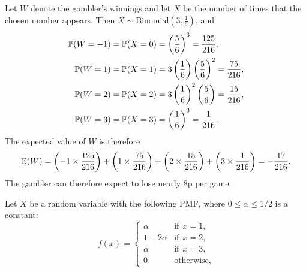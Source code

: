 \begin{exercise}
\begin{questions}
\begin{answer}
Let $W$ denote the gambler's winnings and let $X$ be the number of times that the chosen number appears. Then $X\sim\text{Binomial}(3,\frac{1}{6})$, and
\begin{align*}
\mathbb{P}(W=-1)	& = \mathbb{P}(X=0) = 	\left(\frac{5}{6}\right)^3							= \frac{125}{216}, \\
\mathbb{P}(W= 1)	& = \mathbb{P}(X=1) = 	3\left(\frac{1}{6}\right)\left(\frac{5}{6}\right)^2 	= \frac{75}{216}, \\
\mathbb{P}(W= 2)	& = \mathbb{P}(X=2) = 	3\left(\frac{1}{6}\right)^2\left(\frac{5}{6}\right)   	= \frac{15}{216}, \\
\mathbb{P}(W= 3)	& = \mathbb{P}(X=3) = 	\left(\frac{1}{6}\right)^3 = \frac{1}{216}. \\
\end{align*}
The expected value of $W$ is therefore
\[
\mathbb{E}(W) = \left(-1 \times\frac{125}{216}\right) + \left(1 \times\frac{75}{216}\right) + \left(2 \times\frac{15}{216}\right) + \left(3 \times\frac{1}{216}\right) = -\frac{17}{216}.
\]
The gambler can therefore expect to lose nearly 8p per game.
\end{answer}


\question
Let $X$ be a random variable with the following PMF, where $0\leq\alpha\leq1/2$ is a constant:
\[
f(x) = \begin{cases}
	\alpha		& \text{if}\ \ x=1, \\
	1-2\alpha	& \text{if}\ \ x=2, \\
	\alpha		& \text{if}\ \ x=3, \\
	0			& \text{otherwise,}
\end{cases}
\]
\end{questions}
\end{exercise}
